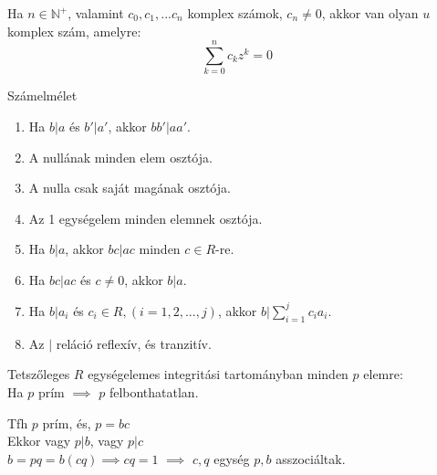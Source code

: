 \begin{frame}
\begin{tcolorbox}[title={Tétel: Az algebra alaptétele}]
Ha $n \in \mathbb{N}^+$, valamint $c_0, c_1, ... c_n$ komplex számok, $c_n \neq 0$, akkor van olyan $u$ komplex szám, amelyre:\\
$$\sum_{k = 0}^n c_kz^k = 0$$
\end{tcolorbox}
\end{frame}

\begin{frame}[plain]
\begin{tcolorbox}[center, colback={myyellow}, coltext={black}, colframe={myyellow}]
    {\Huge Számelmélet}
    \mmedskip
\end{tcolorbox}
\end{frame}

\begin{frame}
\begin{tcolorbox}[title={Oszthatóság egységelemes integritási tarományban (Emlékeztető)}]
\end{tcolorbox}
\end{frame}

\begin{frame}
\begin{tcolorbox}[title={Tétel: Az oszthatóság tulajdonságai EIT-ban}]
\begin{enumerate}
\item Ha $b|a$ és $b'|a'$, akkor $bb'|aa'$.
\item A nullának minden elem osztója.
\item A nulla csak saját magának osztója.
\item Az 1 egységelem minden elemnek osztója.
\item Ha $b|a$, akkor $bc|ac$ minden $c \in R$-re.
\item Ha $bc|ac$ és $c \neq 0$, akkor $b|a$.
\item Ha $b|a_i$ és $c_i \in R, (i = 1, 2, ..., j)$, akkor $b|\sum^j_{i=1} c_ia_i$.
\item Az $|$ reláció reflexív, és tranzitív.
\end{enumerate}
\end{tcolorbox}
\end{frame}

\begin{frame}
\begin{tcolorbox}[title={Tétel: Prím és irreducibilis elem EIT-ban}]
Tetszőleges $R$ egységelemes integritási tartományban minden $p$ elemre:\\
Ha $p$ prím $\implies$ $p$ felbonthatatlan.
\end{tcolorbox}

\begin{tcolorbox}[title={Bizonyítás}]
Tfh $p$ prím, és, $p = bc$\\
Ekkor vagy $p|b$, vagy $p|c$\\
$b = pq = b(cq) \implies cq = 1$ $\implies$ $c, q$ egység $p, b$ asszociáltak.
\end{tcolorbox}
\end{frame}


